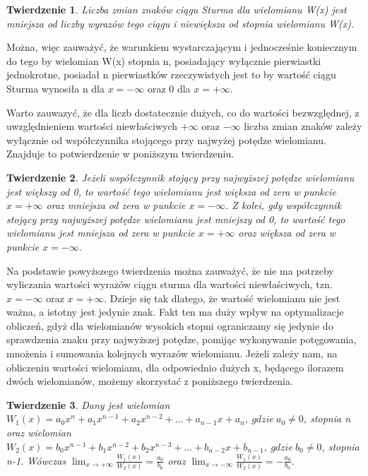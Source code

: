 \documentclass[twoside,a4paper]{book}
\newtheorem{theorem}{Twierdzenie}
\begin{document}
\begin{theorem}
	Liczba zmian znaków ciągu Sturma dla wielomianu W(x) jest mniejsza od liczby wyrazów tego ciągu i niewiększa od stopnia wielomianu W(x).
\end{theorem}

Można, więc zauważyć, że warunkiem wystarczającym i jednocześnie koniecznym do tego by wielomian W(x) stopnia n, posiadający wyłącznie pierwiastki jednokrotne, posiadał n pierwiastków rzeczywistych jest to by wartość ciągu Sturma wynosiła n dla $x=-\infty$ oraz 0 dla $x=+\infty$. 

Warto zauwazyć, że dla liczb dostatecznie dużych, co do wartości bezwzględnej, z uwzględnieniem wartości niewłaściwych $+\infty$ oraz $-\infty$ liczba zmian znaków zależy wyłącznie od współczynnika stojącego przy najwyżej potędze wielomianu. Znajduje to potwierdzenie w poniższym twierdzeniu.

\begin{theorem}
	Jeżeli współczynnik stojący przy najwyższej potędze wielomianu jest większy od 0, to wartość tego wielomianu jest większa od zera w punkcie $x=+\infty$ oraz mniejsza od zera w punkcie $x=-\infty$.
	Z kolei, gdy współczynnik stojący przy najwyższej potędze wielomianu jest mniejszy od 0, to wartość tego wielomianu jest mniejsza od zera w punkcie $x=+\infty$ oraz większa od zera w punkcie $x=-\infty$.
\end{theorem}

Na podstawie powyższego twierdzenia można zauważyć, że nie ma potrzeby wyliczania wartości wyrazów ciągu sturma dla wartości niewłaściwych, tzn. $x=-\infty$ oraz $x=+\infty.$ Dzieje się tak dlatego, że wartość wielomianu nie jest ważna, a istotny jest jedynie znak. Fakt ten ma duży wpływ na optymalizacje obliczeń, gdyż dla wielomianów wysokich stopni ograniczamy się jedynie do sprawdzenia znaku przy najwyższej potędze, pomijąc wykonywanie potęgowania, mnożenia i sumowania kolejnych wyrazów wielomianu.
Jeżeli zależy nam, na obliczeniu wartości wielomianu, dla odpowiednio dużych x, będącego ilorazem dwóch wielomianów, możemy skorzystać z poniższego twierdzenia.

\begin{theorem}
	Dany jest wielomian $W_1(x) = a_0x^n + a_1x^{n-1} + a_2x^{n-2} + ... + a_{n-1}x  + a_n,\ gdzie \ a_0 \ne 0$, stopnia n oraz wielomian $W_2(x) = b_0x^{n-1} + b_1x^{n-2} + b_2x^{n-3} + ... + b_{n-2}x  + b_{n-1},\ gdzie\ b_0 \ne 0$, stopnia n-1. Wówczas $\lim_{x \to +\infty}\frac{W_1(x)}{W_2(x)} = \frac{a_0}{b_0}$ oraz $\lim_{x \to -\infty}\frac{W_1(x)}{W_2(x)} = -\frac{a_0}{b_0}.$
\end{theorem}
\end{document}
